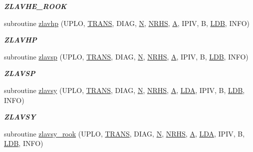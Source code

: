 \begin{DoxyCompactItemize}
\begin{DoxyCompactList}\small\item\em {\bfseries Z\+L\+A\+V\+H\+E\+\_\+\+R\+O\+O\+K} \end{DoxyCompactList}\item 
subroutine \hyperlink{group__complex16__lin_ga6fd119aaf103190a81bde129cee22b70}{zlavhp} (U\+P\+L\+O, \hyperlink{superlu__enum__consts_8h_a0c4e17b2d5cea33f9991ccc6a6678d62a1f61e3015bfe0f0c2c3fda4c5a0cdf58}{T\+R\+A\+N\+S}, D\+I\+A\+G, \hyperlink{polmisc_8c_a0240ac851181b84ac374872dc5434ee4}{N}, \hyperlink{example__user_8c_aa0138da002ce2a90360df2f521eb3198}{N\+R\+H\+S}, \hyperlink{classA}{A}, I\+P\+I\+V, B, \hyperlink{example__user_8c_a50e90a7104df172b5a89a06c47fcca04}{L\+D\+B}, I\+N\+F\+O)
\begin{DoxyCompactList}\small\item\em {\bfseries Z\+L\+A\+V\+H\+P} \end{DoxyCompactList}\item 
subroutine \hyperlink{group__complex16__lin_ga20022a8d9003ce2c4853d7f926d80c12}{zlavsp} (U\+P\+L\+O, \hyperlink{superlu__enum__consts_8h_a0c4e17b2d5cea33f9991ccc6a6678d62a1f61e3015bfe0f0c2c3fda4c5a0cdf58}{T\+R\+A\+N\+S}, D\+I\+A\+G, \hyperlink{polmisc_8c_a0240ac851181b84ac374872dc5434ee4}{N}, \hyperlink{example__user_8c_aa0138da002ce2a90360df2f521eb3198}{N\+R\+H\+S}, \hyperlink{classA}{A}, I\+P\+I\+V, B, \hyperlink{example__user_8c_a50e90a7104df172b5a89a06c47fcca04}{L\+D\+B}, I\+N\+F\+O)
\begin{DoxyCompactList}\small\item\em {\bfseries Z\+L\+A\+V\+S\+P} \end{DoxyCompactList}\item 
subroutine \hyperlink{group__complex16__lin_ga2728fb8c1a2c82e2e1b3a25a3178d666}{zlavsy} (U\+P\+L\+O, \hyperlink{superlu__enum__consts_8h_a0c4e17b2d5cea33f9991ccc6a6678d62a1f61e3015bfe0f0c2c3fda4c5a0cdf58}{T\+R\+A\+N\+S}, D\+I\+A\+G, \hyperlink{polmisc_8c_a0240ac851181b84ac374872dc5434ee4}{N}, \hyperlink{example__user_8c_aa0138da002ce2a90360df2f521eb3198}{N\+R\+H\+S}, \hyperlink{classA}{A}, \hyperlink{example__user_8c_ae946da542ce0db94dced19b2ecefd1aa}{L\+D\+A}, I\+P\+I\+V, B, \hyperlink{example__user_8c_a50e90a7104df172b5a89a06c47fcca04}{L\+D\+B}, I\+N\+F\+O)
\begin{DoxyCompactList}\small\item\em {\bfseries Z\+L\+A\+V\+S\+Y} \end{DoxyCompactList}\item 
subroutine \hyperlink{group__complex16__lin_ga5876cbc2b405210918c0858de81ea93f}{zlavsy\+\_\+rook} (U\+P\+L\+O, \hyperlink{superlu__enum__consts_8h_a0c4e17b2d5cea33f9991ccc6a6678d62a1f61e3015bfe0f0c2c3fda4c5a0cdf58}{T\+R\+A\+N\+S}, D\+I\+A\+G, \hyperlink{polmisc_8c_a0240ac851181b84ac374872dc5434ee4}{N}, \hyperlink{example__user_8c_aa0138da002ce2a90360df2f521eb3198}{N\+R\+H\+S}, \hyperlink{classA}{A}, \hyperlink{example__user_8c_ae946da542ce0db94dced19b2ecefd1aa}{L\+D\+A}, I\+P\+I\+V, B, \hyperlink{example__user_8c_a50e90a7104df172b5a89a06c47fcca04}{L\+D\+B}, I\+N\+F\+O)

\end{DoxyCompactItemize}
